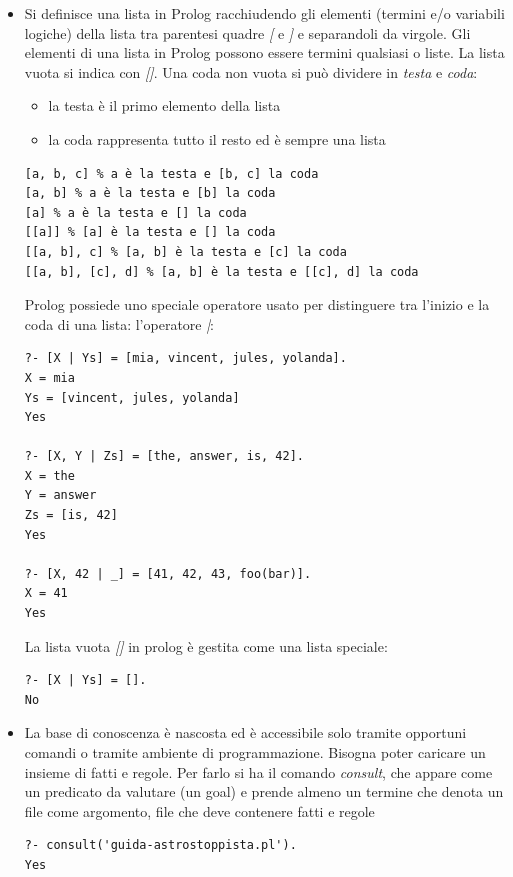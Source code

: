 \documentclass[a4paper,12pt, oneside]{book}
\begin{document}
\begin{itemize}
\begin{esempio}
\begin{verbatim}
aula(Corso, Luogo) :- corso(Corso, _, Luogo, _).
\end{verbatim}
		      oppure ancora i predicati che abbiamo definito a partire dalle relazioni con 6 o 4 campi possono essere ricodificate con predicati binari:
		      \begin{verbatim}
giorno(linguaggi, martedì).
orario(linguaggi, '9:30').
edificio(linguaggi, 'U4').
aula(linguaggi, 3).
docente(linguaggi, antoniotti).
\end{verbatim}
		      La relazioni a 6 o 4 argomenti possono essere ricostruite in a partire da queste relazioni binarie. La costruzione di schemi \textit{RDF/XML} (e, a volte,\textit{ SQL}) corrisponde a questa operazione di ri-rappresentazione
	      \end{esempio}
	\item Si definisce una lista in Prolog racchiudendo gli elementi (termini e/o variabili logiche) della lista tra parentesi quadre \textit{[} e \textit{]} e separandoli da virgole. Gli elementi di una lista in Prolog possono essere termini
	      qualsiasi o liste. La lista vuota si indica con \textit{[]}. Una coda non vuota si può dividere in \textit{testa} e \textit{coda}:
	      \begin{itemize}
		      \item la testa è il primo elemento della lista
		      \item la coda rappresenta tutto il resto ed è sempre una lista
	      \end{itemize}
	      \begin{verbatim}
[a, b, c] % a è la testa e [b, c] la coda
[a, b] % a è la testa e [b] la coda
[a] % a è la testa e [] la coda
[[a]] % [a] è la testa e [] la coda
[[a, b], c] % [a, b] è la testa e [c] la coda
[[a, b], [c], d] % [a, b] è la testa e [[c], d] la coda
\end{verbatim}
	      Prolog possiede uno speciale operatore usato per distinguere tra l'inizio e la coda di una lista: l'operatore \textit{|}:
	      \begin{verbatim}
?- [X | Ys] = [mia, vincent, jules, yolanda].
X = mia
Ys = [vincent, jules, yolanda]
Yes

?- [X, Y | Zs] = [the, answer, is, 42].
X = the
Y = answer
Zs = [is, 42]
Yes

?- [X, 42 | _] = [41, 42, 43, foo(bar)].
X = 41
Yes
\end{verbatim}
	      La lista vuota \textit{[]} in prolog è gestita come una lista speciale:
	      \begin{verbatim}
?- [X | Ys] = [].
No
\end{verbatim}
	\item La base di conoscenza è nascosta ed è accessibile solo tramite opportuni comandi o tramite ambiente di programmazione. Bisogna poter caricare un insieme di fatti e regole. Per farlo si ha il comando \textit{consult}, che appare come un predicato da valutare (un goal) e prende almeno un termine che denota un file come argomento, file che deve contenere fatti e regole
	      \begin{verbatim}
?- consult('guida-astrostoppista.pl').
Yes


\end{verbatim}
\end{itemize}
\end{document}
